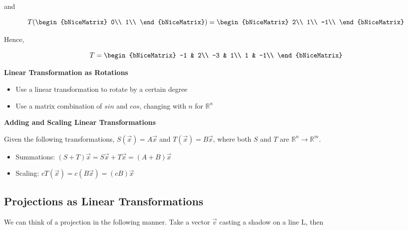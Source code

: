 and

\begin{equation}
	T(
	\begin{bNiceMatrix}
		0\\
		1\\
	\end{bNiceMatrix}
	)
	=
	\begin{bNiceMatrix}
		2\\
		1\\
		-1\\
	\end{bNiceMatrix}
\end{equation}

Hence,

\begin{equation}
	T
	=
	\begin{bNiceMatrix}
		-1 & 2\\
		-3 & 1\\
		1 & -1\\
	\end{bNiceMatrix}
\end{equation}

\textbf{Linear Transformation as Rotations}
\begin{itemize}
	\item Use a linear transformation to rotate by a certain degree
	\item Use a matrix combination of $sin$ and $cos$, changing with $n$ for $\mathbb{R}^n$
\end{itemize}

\textbf{Adding and Scaling Linear Transformations}

Given the following transformations, $S(\vec{x}) = A\vec{x}$ and $T(\vec{x}) = B\vec{x}$, where both $S$ and $T$ are $\mathbb{R}^n \rightarrow \mathbb{R}^m$.

\begin{itemize}
	\item Summations: $(S + T)\vec{x} = S\vec{x} + T\vec{x} = (A + B)\vec{x}$
	\item Scaling: $cT(\vec{x}) = c(B\vec{x}) = (cB)\vec{x}$
\end{itemize}


\subsection{Projections as Linear Transformations}\label{concept3.5}

We can think of a projection in the following manner. Take a  vector $\vec{v}$ casting a shadow on a line L, then
\\

